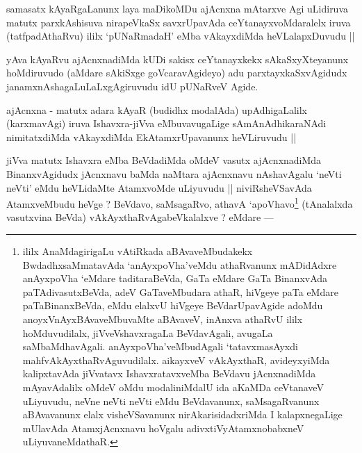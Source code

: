 
\begin{artha}
samasatx kAyaRgaLanunx laya maDikoMDu ajAcnxna mAtarxve Agi uLidiruva matutx parxkAshisuva nirapeVkaSx savxrUpavAda ceYtanayxvoMdaralelx iruva (tatfpadAthaRvu) ililx `pUNaRmadaH' eMba vAkayxdiMda heVLalapxDuvudu ||
\end{artha}


\begin{artha}
yAva kAyaRvu ajAcnxnadiMda kUDi sakisx ceYtanayxkekx sAkaSxyXteyanunx hoMdiruvudo (aMdare sAkiSxge goVcaravAgideyo) adu parxtayxkaSxvAgidudx janamxnAshagaLuLaLxgAgiruvudu idU pUNaRveV Agide.
\end{artha}

\begin{artha}
ajAcnxna - matutx adara kAyaR (budidhx modalAda) upAdhigaLalilx (karxmavAgi) iruva Ishavxra-jiVva eMbuvavugaLige sAmAnAdhikaraNAdi nimitatxdiMda vAkayxdiMda EkAtamxrUpavanunx heVLiruvudu ||
\end{artha}


\begin{artha}
jiVva matutx Ishavxra eMba BeVdadiMda oMdeV vasutx ajAcnxnadiMda BinanxvAgidudx jAcnxnavu baMda naMtara ajAcnxnavu nAshavAgalu `neVti neVti' eMdu heVLidaMte AtamxvoMde uLiyuvudu || niviRsheVSavAda AtamxveMbudu heVge ? BeVdavo, saMsagaRvo, athavA `apoVhavo\footnote{ililx AnaMdagirigaLu vAtiRkada aBAvaveMbudakekx BwdadhxsaMmatavAda `anAyxpoVha'veMdu athaRvanunx mADidAdxre anAyxpoVha `eMdare taditaraBeVda, GaTa eMdare GaTa BinanxvAda paTAdivasutxBeVda, adeV GaTaveMbudara athaR, hiVgeye paTa eMdare paTaBinanxBeVda, eMdu elalxvU hiVgeye BeVdarUpavAgide adoMdu anoyxVnAyxBAvaveMbuvaMte aBAvaveV, inAnxva athaRvU ililx hoMduvudilalx, jiVveVshavxragaLa BeVdavAgali, avugaLa saMbaMdhavAgali. anAyxpoVha'veMbudAgali `tatavxmasAyxdi mahfvAkAyxthaRvAguvudilalx. aikayxveV vAkAyxthaR, avideyxyiMda kalipxtavAda jiVvatavx IshavxratavxveMba BeVdavu jAcnxnadiMda mAyavAdalilx oMdeV oMdu modaliniMdalU ida aKaMDa ceVtanaveV uLiyuvudu, neVne neVti neVti eMdu BeVdavanunx, saMsagaRvanunx aBAvavanunx elalx visheVSavanunx nirAkarisidadxriMda I kalapxnegaLige mUlavAda AtamxjAcnxnavu hoVgalu adivxtiVyAtamxnobabxneV uLiyuvaneMdathaR.} (tAnalalxda vasutxvina BeVda) vAkAyxthaRvAgabeVkalalxve ? eMdare ---
\end{artha}

